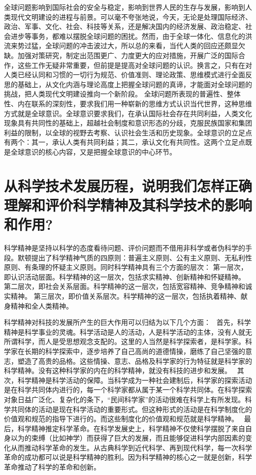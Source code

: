 \documentclass[a4paper]{article}
\begin{document}
全球问题影响到国际社会的安全与稳定，影响到世界人民的生存与发展，影响到人类现代文明建设的进程与前景。可以毫不夸张地说，今天，无论是处理国际经济、政治、军事、文化、社会、科技等关系，还是解决国内的经济发展、政治稳定、社会进步等事务，都难以摆脱全球问题的困扰。然而，由于全球一体化、信息化的洪流来势过猛，全球问题的冲击波过大，所以总的来看，当代人类的回应还颇显欠缺。加强对策研究，制定出范围更广、力度更大的应对措施，开展广泛的国际合作，这些工作无疑非常重要，但前提是提高对全球问题的认识。换言之，只有在对人类已经认同和习惯的一切行为规范、价值准则、理论政策、思维模式进行全面反思的基础上，从文化内涵与理论高度上把握全球问题的真谛，才能面对全球问题的挑战，把人类现代文明建设推向一个新阶段。
全球问题所表现的普遍性、整体性、内在联系的深刻性，要求我们用一种崭新的思维方式认识当代世界，这种思维方式就是全球意识。全球意识要求我们，在承认国际社会存在共同利益，人类文化现象具有共同性的基础上，超越社会制度和意识形态的分歧，克服民族国家和集团利益的限制，以全球的视野去考察、认识社会生活和历史现象。全球意识的立足点有两个：其一，承认人类有共同利益；其二，承认文化有共同性。这两个立足点既是全球意识的核心内容，又是把握全球意识的中心环节。


\section{从科学技术发展历程，说明我们怎样正确理解和评价科学精神及其科学技术的影响和作用?}

科学精神是坚持以科学的态度看待问题、评价问题而不借用非科学或者伪科学的手段。默顿提出了科学精神气质的四原则：普遍主义原则、公有主义原则、无私利性原则、有条理的怀疑主义原则。同时科学精神具有三个方面的层次：
第一层次，即认识活动层面。科学精神的这一层次，包括求实精神、创新精神和怀疑精神。
第二层次，即社会关系层面。科学精神的这一层次，包括宽容精神、竞争精神和诚实精神。
第三层次，即价值关系层次。科学精神的这一层次，包括执着精神、献身精神和全人类精神。 

科学精神对科技的发展所产生的巨大作用可以归结为以下几个方面： 
首先，科学精神是科学事业的灵魂。科学活动是人的活动，人是科学活动的主体，没有人就无所谓科学，而人是受思想观念支配的。这里的人当然是科学探索者，是科学家。科学家在长期的科学探索中，逐步培养了自己高尚的道德情操，磨练了自己坚强的意志，塑造了高贵的品格。这些情操、意志、品格及科学家的行为特征就是科学家的科学精神。没有这种科学家的内在的科学精神，就没有科技的进步和发展。 
其次，科学精神是科学活动的保障。当科学成为一种社会建制后，科学家的探索活动是在科学共同体内进行的，每一个科学家都从属于某一个科学共同体。在科学探索对象日益广泛化、复杂化的条下，“民间科学家”的活动很难在科学上有所发现。科学共同体的活动是现在科学活动的重要形式。但这种形式的活动是在科学制度化的价值观和规范的指导下进行的。而这些制度化的价值观和规范就是科学精神。 
最后，科学精神推定科学革命。在科学发展史上，科学精神不仅使科学摆脱了来自自身以为的束缚（比如神学）而获得了巨大的发展，而且能够促进科学内部因素的变化从而推动科学革命的发生。从古典科学到近代科学、再到现代科学，每一次科学革命的成功都可以说是科学精神的胜利。因为科学精神的核心之一就是创新，科学革命推动了科学的革命和创新。
\end{document}
